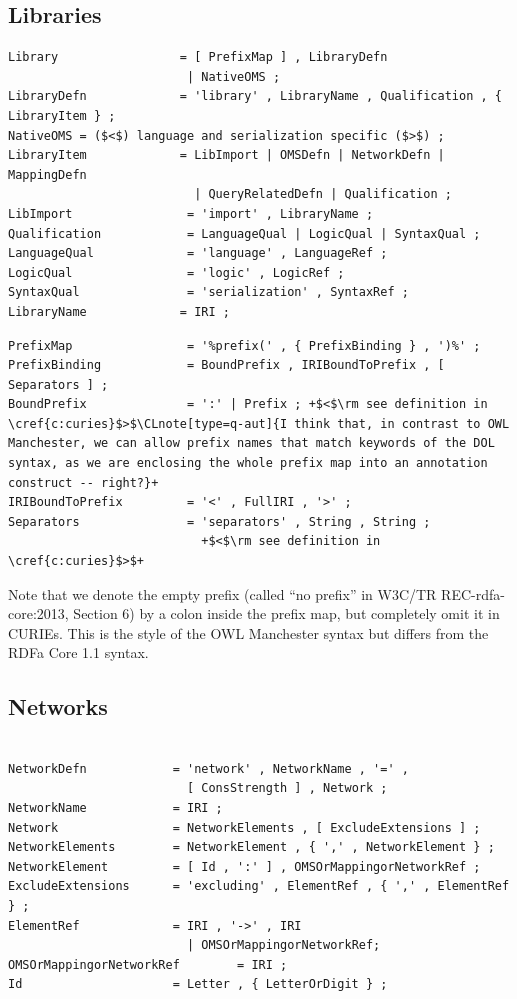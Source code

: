 \documentclass[10pt,fleqn,%
\ifpretendfinal
final%
\else
draft%
\fi,
]{scrreprt}
\makeatletter
\newcommand*\CommentAuthor{}
\renewcommand*\CommentAuthor{#1}}
\newcommand*\CommentDate{}
\renewcommand*\CommentDate{#1}}
\newcommand*\CommentId{}
\renewcommand*\CommentId{#1}}
\newcommand*\CommentType{}
\renewcommand*\CommentType{#1}}
\newcommand*{\SetCommentColorByType}[1]{%
\edef\localType{{#1}}%
\expandafter\ifstrequal\localType{q-aut}{\colorlet{CommentColor}{red}}{%
\expandafter\ifstrequal\localType{q-all}{\colorlet{CommentColor}{orange}}{%
\expandafter\ifstrequal\localType{todo}{\colorlet{CommentColor}{orange}}{%
\expandafter\ifstrequal\localType{fyi}{\colorlet{CommentColor}{lightgray}}{%
\colorlet{CommentColor}{yellow}}}}}}
\newcommand*{\SetCommentPrefixByType}[1]{%
\edef\localType{{#1}}%
\expandafter\@ifmtarg\localType{%
\edef\CommentPrefix{}%
}{%
\caseupper[q]{#1}%
\edef\CommentPrefix{\thestring: }%
}}
\newcommand*{\initComment}[1]{%
\setkeys{Comment}{#1}%
\SetCommentColorByType{\CommentType}%
\relax%
\SetCommentPrefixByType{\CommentType}%
\relax%
}
\newcommand*{\todonote}[2][]{%
\initComment{#1}%
\pdfcomment[author=\CommentAuthor,color=CommentColor,date=\CommentDate,id=\CommentId]{%
\CommentPrefix
#2}}
\renewcommand*{\todonote}[2][]{%
\initComment{#1}%
\ednote{\CommentPrefix #2}}
\newcommand*{\CLnote}[2][author=Christoph Lange]{%
\todonote[author=Christoph Lange,#1]{#2} 
}
\newcommand{\clauserefname}{clause}
\newcommand{\cref}[1]{\clauserefname~\ref{#1}}
\newcommand{\ssclause}[1]{\subsection{#1}}
\newcommand{\nisref}[1]{#1}
\makeatother
\begin{document}
 
\ssclause{Libraries}

\begin{lstlisting}[language=ebnf,escapeinside={()},morecomment={[l]{\%\%\ }}]
Library                 = [ PrefixMap ] , LibraryDefn
                         | NativeOMS ;
LibraryDefn             = 'library' , LibraryName , Qualification , { LibraryItem } ;
NativeOMS = ($<$) language and serialization specific ($>$) ;
LibraryItem             = LibImport | OMSDefn | NetworkDefn | MappingDefn 
                          | QueryRelatedDefn | Qualification ;
LibImport                = 'import' , LibraryName ;
Qualification            = LanguageQual | LogicQual | SyntaxQual ;
LanguageQual             = 'language' , LanguageRef ;
LogicQual                = 'logic' , LogicRef ;
SyntaxQual               = 'serialization' , SyntaxRef ;
LibraryName             = IRI ;
\end{lstlisting}

\begin{lstlisting}[language=ebnf,escapechar=+,morecomment={[l]{\%\%\ }}]
PrefixMap                = '%prefix(' , { PrefixBinding } , ')%' ;
PrefixBinding            = BoundPrefix , IRIBoundToPrefix , [ Separators ] ;
BoundPrefix              = ':' | Prefix ; +$<$\rm see definition in \cref{c:curies}$>$\CLnote[type=q-aut]{I think that, in contrast to OWL Manchester, we can allow prefix names that match keywords of the DOL syntax, as we are enclosing the whole prefix map into an annotation construct -- right?}+ 
IRIBoundToPrefix         = '<' , FullIRI , '>' ;
Separators               = 'separators' , String , String ;
                           +$<$\rm see definition in \cref{c:curies}$>$+
\end{lstlisting}

Note that we denote the empty prefix (called ``no prefix'' in \nisref{W3C/TR REC-rdfa-core:2013, Section 6}) by a colon inside the prefix map, but completely omit it in CURIEs.  This is the style of the OWL Manchester syntax \cite{W3C:NOTE-owl2-manchester-syntax-20091027} but differs from the RDFa Core 1.1 syntax.

\vspace{1em}

\ssclause{Networks}

\begin{lstlisting}[language=ebnf,escapeinside={()},morecomment={[l]{\%\%\ }}]

NetworkDefn            = 'network' , NetworkName , '=' , 
                         [ ConsStrength ] , Network ;
NetworkName            = IRI ;
Network                = NetworkElements , [ ExcludeExtensions ] ;
NetworkElements        = NetworkElement , { ',' , NetworkElement } ;
NetworkElement         = [ Id , ':' ] , OMSOrMappingorNetworkRef ;
ExcludeExtensions      = 'excluding' , ElementRef , { ',' , ElementRef } ;
ElementRef             = IRI , '->' , IRI 
                         | OMSOrMappingorNetworkRef;
OMSOrMappingorNetworkRef        = IRI ;
Id                     = Letter , { LetterOrDigit } ;
\end{lstlisting}
\end{document}

